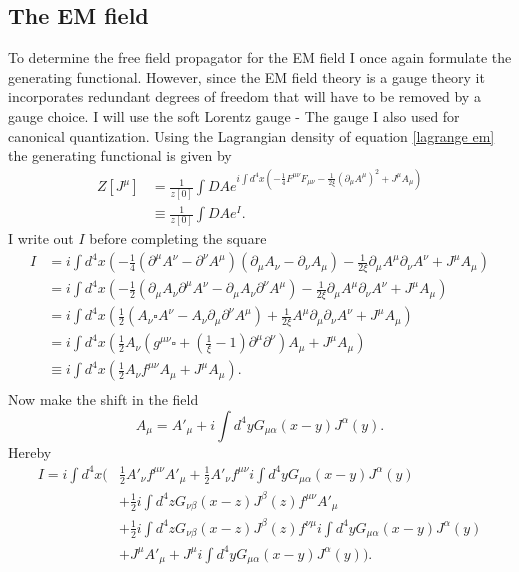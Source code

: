 \subsection*{The EM field} 
To determine the free field propagator for the EM field I once again formulate the generating functional. However, since the EM field theory is a gauge theory it incorporates redundant degrees of freedom that will have to be removed by a gauge choice. I will use the soft Lorentz gauge - The gauge I also used for canonical quantization. Using the Lagrangian density of equation \eqref{lagrange em} the generating functional is given by
\begin{equation}
	\begin{split}
		Z[J^\mu]&=\frac{1}{z[0]}\int DAe^{i\int d^4x (-\frac{1}{4}F^{\mu\nu}F_{\mu\nu}-\frac{1}{2\xi}(\partial_\mu A^\mu)^2+J^\mu A_\mu)}\\
		&\equiv\frac{1}{z[0]}\int DAe^I.
	\end{split}
\end{equation} 
I write out $I$ before completing the square
 \begin{equation}
	\begin{split}
		I&=i\int d^4x (-\frac{1}{4}(\partial^\mu A^\nu-\partial^\nu A^\mu)(\partial_\mu A_\nu-\partial_\nu A_\mu)-\frac{1}{2\xi}\partial_\mu A^\mu\partial_\nu A^\nu+J^\mu A_\mu)\\
		&=i\int d^4x (-\frac{1}{2}(\partial_\mu A_\nu\partial^\mu A^\nu-\partial_\mu A_\nu\partial^\nu A^\mu)-\frac{1}{2\xi}\partial_\mu A^\mu\partial_\nu A^\nu+J^\mu A_\mu)\\
		&=i\int d^4x (\frac{1}{2}(A_\nu\square A^\nu- A_\nu\partial_\mu\partial^\nu A^\mu)+\frac{1}{2\xi} A^\mu\partial_\mu\partial_\nu A^\nu+J^\mu A_\mu)\\
		&=i\int d^4x (\frac{1}{2}A_\nu(g^{\mu\nu}\square+(\frac{1}{\xi}-1)\partial^\mu\partial^\nu)A_\mu+J^\mu A_\mu)\\
		&\equiv i\int d^4x (\frac{1}{2}A_\nu f^{\mu\nu}A_\mu+J^\mu A_\mu).\\
	\end{split}
\end{equation} 
Now make the shift in the field
\begin{equation}
	A_\mu=A'_\mu+i\int d^4yG_{\mu\alpha}(x-y)J^\alpha(y).
\end{equation} 
Hereby
 \begin{equation}
	\begin{split}
		I=i \int d^4x \bigg(&\frac{1}{2}A'_\nu f^{\mu\nu}A'_\mu+\frac{1}{2}A'_\nu f^{\mu\nu}i\int d^4y G_{\mu\alpha}(x-y)J^\alpha(y)\\
		&+\frac{1}{2}i\int d^4z G_{\nu\beta}(x-z)J^\beta(z)f^{\mu\nu}A'_\mu\\
		&+\frac{1}{2}i\int d^4z G_{\nu\beta}(x-z)J^\beta(z)f^{\nu\mu}i\int d^4y G_{\mu\alpha}(x-y)J^\alpha(y)\\
		&+J^\mu A'_\mu+J^\mu i\int d^4y G_{\mu\alpha}(x-y)J^\alpha(y)\bigg).\\
	\end{split}
\end{equation} 

